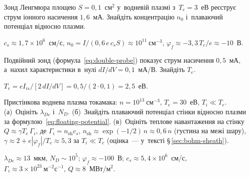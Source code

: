 \begin{problem}\label{prb:PlasmaProbe}
	Зонд Ленгмюра площею $S=0{,}1$~см$^2$ у~водневій плазмі з~$T_e=3$~еВ
	реєструє струм іонного насичення $1{,}6$~мА. Знайдіть концентрацію $n_0$ і~плаваючий
	потенціал відносно плазми.
	\begin{solution}
		$c_s\approx1{,}7\times10^{6}$~см/с, $n_0=I/(0{,}6\,e\,c_sS)\approx10^{11}~\mathrm{см}^{-3}$,
	$\varphi_f\approx-3{,}3\,T_e/e\approx-10$~В.
	\end{solution}
\end{problem}

\begin{problem}\label{prb:DoubleProbe}
	Подвійний зонд (формула~\eqref{eq:double-probe}) показує струм насичення $0{,}5$~мА,
	а~нахил характеристики в~нулі $dI/dV=0{,}1$~мА/В. Знайдіть $T_e$.
	\begin{solution}
		$T_e=eI_{is}/[2\,dI/dV]=0{,}5/(2\cdot0{,}1)=2{,}5$~еВ.
	\end{solution}
\end{problem}

\begin{problem}\label{prb:EdgePlasmaSheath}
	Пристінкова воднева плазма токамака: $n=10^{13}~\mathrm{см}^{-3}$, $T_e=30$~еВ, $T_i\ll T_e$.
	(а)~Оцініть $\lambda_{De}$ і~$N_D$. (б)~Знайдіть плаваючий потенціал стінки відносно
	плазми за формулою~\eqref{eq:floating-potential}. (в)~Оцініть теплове навантаження на стінку
	$Q\approx\gamma T_e\,\Gamma_i$, де $\Gamma_i=n_\mathrm{sh}c_s$, $n_\mathrm{sh}\approx\exp(-1/2)\,n\approx0{,}6\,n$
	(густина на межі шару), $\gamma\approx2+e|\varphi_f|/T_e\approx5{,}3$ за $T_i\ll T_e$ (оцінка~--- у~тексті §\,\ref{sec:bohm-sheath}).
	\begin{solution}
		$\lambda_{De}\approx13$~мкм, $N_D\sim10^5$; $\varphi_f\approx-100$~В;
	$c_s\approx5{,}4\times10^6$~см/с, $\Gamma_i\approx3\times10^{23}~\mathrm{м}^{-2}\mathrm{с}^{-1}$,
	$Q\approx8$~МВт/м$^2$.
	\end{solution}
\end{problem}


